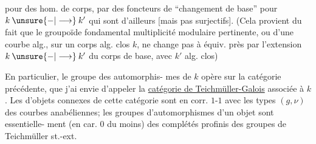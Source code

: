pour des hom. de corps, par des foncteurs
de ``changement de base'' pour $k\mathbin{\unsure{-|\longrightarrow}}k'$
qui sont d'ailleurs   [mais
pas  surjectifs]. (Cela provient
du fait que le groupoïde fondamental
   multiplicité modulaire pertinente,
ou d'une courbe alg., sur un corps alg.
clos $k$, ne change pas à équiv. près
par l'extension $k\mathbin{\unsure{-|\longrightarrow}}k'$ du corps de base,
avec $k'$ alg. clos) 

En particulier, le groupe des automorphis-
mes de $k$ opère sur la catégorie précédente,
que j'ai envie d'appeler la \uline{catégorie de
Teichmüller-Galois} associée à $k$. Les
  d'objets connexes de cette
catégorie sont en corr. $1$-$1$ avec les types
$(g,\nu)$ des courbes anabéliennes; les groupes
d'automorphismes d'un objet sont essentielle-
ment (en car. $0$ du moins) des complétés
profinis des groupes de Teichmüller st.-ext.
